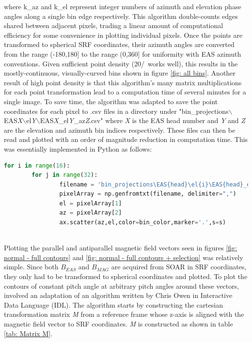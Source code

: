 where k\_az and k\_el represent integer numbers of azimuth and elevation phase angles along a single bin edge respectively. This algorithm double-counts edges shared between adjacent pixels, trading a linear amount of computational efficiency for some convenience in plotting individual pixels. Once the points are transformed to spherical SRF coordinates, their azimuth angles are converted from the range (-180,180] to the range (0,360] for uniformity with EAS azimuth conventions. Given sufficient point density (20/\degree\ works well), this results in the mostly-continuous, visually-curved bins shown in figure \ref{fig: all bins}. Another result of high point density is that this algorithm's many matrix multiplications for each point transformation lead to a computation time of several minutes for a single image. To save time, the algorithm was adapted to save the point coordinates for each pixel to .csv files in a directory under "bin\_projections\(\backslash\)EAS\textit{X}\(\backslash\)el\textit{Y}\(\backslash\)EAS\textit{X}\_el\textit{Y}\_az\textit{Z}.csv" where \textit{X} is the EAS head number and \textit{Y} and \textit{Z} are the elevation and azimuth bin indices respectively. These files can then be read and plotted with an order of magnitude reduction in computation time. This was essentially implemented in Python as follows:
\newpage
\lstset{basicstyle=\tiny, style=myCustomMatlabStyle}
\begin{lstlisting}[language=Python]
for i in range(16):
        for j in range(32):
                filename = 'bin_projections\EAS{head}\el{i}\EAS{head}_el{i}_az{j}.csv'
                pixelArray = np.genfromtxt(filename, delimiter=",")
                el = pixelArray[1]
                az = pixelArray[2]
                ax.scatter(az,el,color=bin_color,marker='.',s=s)
\end{lstlisting}
\\

Plotting the parallel and antiparallel magnetic field vectors seen in figures \ref{fig: normal - full contours} and \ref{fig: normal - full contours + selection} was relatively simple. Since both \(B_{EAS}\) and \(B_{MAG}\) are acquired from SOAR in SRF coordinates, they only had to be transformed to spherical coordinates and plotted. To plot the contours of constant pitch angle at arbitrary pitch angles around these vectors, involved an adaptation of an algorithm written by Chris Owen in Interactive Data Language (IDL)\cite{owen2021}. The algorithm starts by constructing the cartesian transformation matrix \textit{M} from a reference frame whose z-axis is aligned with the magnetic field vector to SRF coordinates. \textit{M} is constructed as shown in table \ref{tab: Matrix M}.

